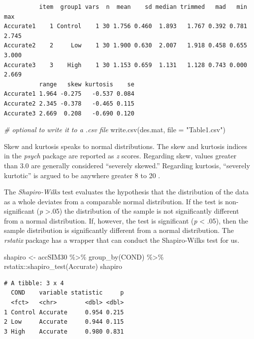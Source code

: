 \documentclass[
  11pt,
]{book}
\newenvironment{Shaded}{\begin{snugshade}}{\end{snugshade}}
\newcommand{\AttributeTok}[1]{\textcolor[rgb]{0.77,0.63,0.00}{#1}}
\newcommand{\CommentTok}[1]{\textcolor[rgb]{0.56,0.35,0.01}{\textit{#1}}}
\newcommand{\FunctionTok}[1]{\textcolor[rgb]{0.00,0.00,0.00}{#1}}
\newcommand{\NormalTok}[1]{#1}
\newcommand{\OtherTok}[1]{\textcolor[rgb]{0.56,0.35,0.01}{#1}}
\newcommand{\SpecialCharTok}[1]{\textcolor[rgb]{0.00,0.00,0.00}{#1}}
\newcommand{\StringTok}[1]{\textcolor[rgb]{0.31,0.60,0.02}{#1}}
\begin{document}
\begin{verbatim}
          item  group1 vars  n  mean    sd median trimmed   mad   min   max
Accurate1    1 Control    1 30 1.756 0.460  1.893   1.767 0.392 0.781 2.745
Accurate2    2     Low    1 30 1.900 0.630  2.007   1.918 0.458 0.655 3.000
Accurate3    3    High    1 30 1.153 0.659  1.131   1.128 0.743 0.000 2.669
          range   skew kurtosis    se
Accurate1 1.964 -0.275   -0.537 0.084
Accurate2 2.345 -0.378   -0.465 0.115
Accurate3 2.669  0.208   -0.690 0.120
\end{verbatim}

\begin{Shaded}
\begin{Highlighting}[]
\CommentTok{\# optional to write it to a .csv file}
\FunctionTok{write.csv}\NormalTok{(des.mat, }\AttributeTok{file =} \StringTok{"Table1.csv"}\NormalTok{)}
\end{Highlighting}
\end{Shaded}

Skew and kurtosis speaks to normal distributions. The skew and kurtosis indices in the \emph{psych} package are reported as \emph{z} scores. Regarding skew, values greater than 3.0 are generally considered ``severely skewed.'' Regarding kurtosis, ``severely kurtotic'' is argued to be anywhere greater 8 to 20 \citep{kline_principles_2016}.

The \emph{Shapiro-Wilks} test evaluates the hypothesis that the distribution of the data as a whole deviates from a comparable normal distribution. If the test is non-significant (\emph{p} \textgreater.05) the distribution of the sample is not significantly different from a normal distribution. If, however, the test is significant (\emph{p} \textless{} .05), then the sample distribution is significantly different from a normal distribution. The \emph{rstatix} package has a wrapper that can conduct the Shapiro-Wilks test for us.

\begin{Shaded}
\begin{Highlighting}[]
\NormalTok{shapiro }\OtherTok{\textless{}{-}}\NormalTok{ accSIM30 }\SpecialCharTok{\%\textgreater{}\%}
    \FunctionTok{group\_by}\NormalTok{(COND) }\SpecialCharTok{\%\textgreater{}\%}
\NormalTok{    rstatix}\SpecialCharTok{::}\FunctionTok{shapiro\_test}\NormalTok{(Accurate)}
\NormalTok{shapiro}
\end{Highlighting}
\end{Shaded}

\begin{verbatim}
# A tibble: 3 x 4
  COND    variable statistic     p
  <fct>   <chr>        <dbl> <dbl>
1 Control Accurate     0.954 0.215
2 Low     Accurate     0.944 0.115
3 High    Accurate     0.980 0.831
\end{verbatim}
\end{document}

